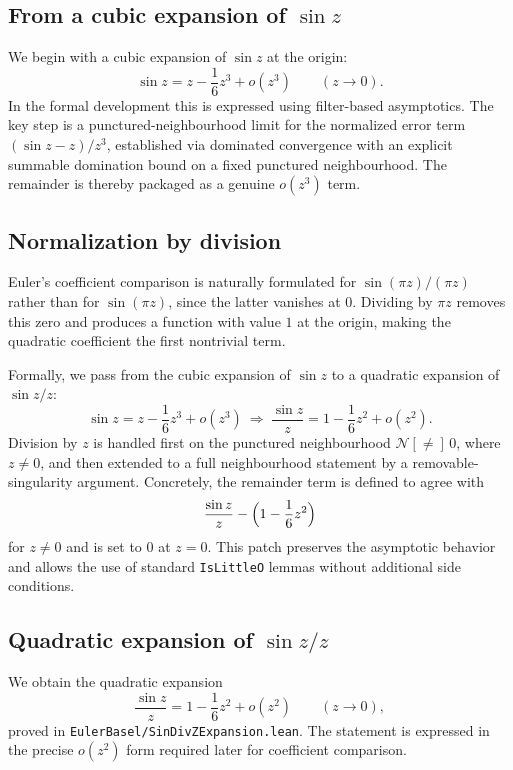 \documentclass[11pt,a4paper]{article}
\theoremstyle{plain}
\theoremstyle{definition}
\newcommand{\msec}[2]{\texorpdfstring{#1}{#2}}
\begin{document}
\subsection{\msec{From a cubic expansion of \ensuremath{\sin z}}{From a cubic expansion of sin z}}

We begin with a cubic expansion of $\sin z$ at the origin:
\[
\sin z = z - \frac{1}{6} z^{3} + o(z^{3})
\qquad (z \to 0).
\]
In the formal development this is expressed using filter-based asymptotics. The key step is a punctured-neighbourhood limit for the normalized error term $(\sin z - z)/z^{3}$, established via dominated convergence with an explicit summable domination bound on a fixed punctured neighbourhood. The remainder is thereby packaged as a genuine $o(z^{3})$ term.

\subsection{\msec{Normalization by division}{Normalization by division}}
Euler’s coefficient comparison is naturally formulated for $\sin(\pi z)/(\pi z)$ rather than for $\sin(\pi z)$, since the latter vanishes at $0$. Dividing by $\pi z$ removes this zero and produces a function with value $1$ at the origin, making the quadratic coefficient the first nontrivial term.

Formally, we pass from the cubic expansion of $\sin z$ to a quadratic expansion of $\sin z / z$:
\[
\sin z = z - \frac{1}{6} z^{3} + o(z^{3})
\ \Longrightarrow\
\frac{\sin z}{z} = 1 - \frac{1}{6} z^{2} + o(z^{2}).
\]
Division by $z$ is handled first on the punctured neighbourhood $\mathcal{N}[{\neq}]\,0$, where $z \neq 0$, and then extended to a full neighbourhood statement by a removable-singularity argument. Concretely, the remainder term is defined to agree with
\[
\frac{\sin z}{z} - \Bigl(1 - \frac{1}{6} z^{2}\Bigr)
\]
for $z \neq 0$ and is set to $0$ at $z = 0$. This patch preserves the asymptotic behavior and allows the use of standard \texttt{IsLittleO} lemmas without additional side conditions.

\subsection{\msec{Quadratic expansion of \ensuremath{\sin z/z}}{Quadratic expansion of sin z / z}}

We obtain the quadratic expansion
\[
\frac{\sin z}{z} = 1 - \frac{1}{6} z^{2} + o(z^{2})
\qquad (z \to 0),
\]
proved in \texttt{EulerBasel/SinDivZExpansion.lean}. The statement is expressed in the precise $o(z^{2})$ form required later for coefficient comparison.
\end{document}
